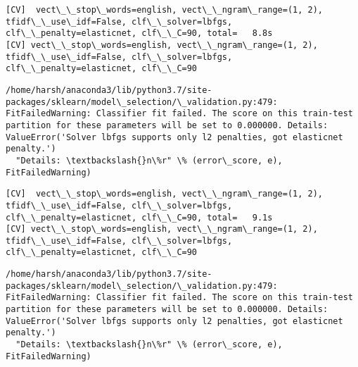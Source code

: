 \documentclass[11pt]{article}
\begin{document}
    \begin{Verbatim}[commandchars=\\\{\}]
[CV]  vect\_\_stop\_words=english, vect\_\_ngram\_range=(1, 2), tfidf\_\_use\_idf=False, clf\_\_solver=lbfgs, clf\_\_penalty=elasticnet, clf\_\_C=90, total=   8.8s
[CV] vect\_\_stop\_words=english, vect\_\_ngram\_range=(1, 2), tfidf\_\_use\_idf=False, clf\_\_solver=lbfgs, clf\_\_penalty=elasticnet, clf\_\_C=90 

    \end{Verbatim}

    \begin{Verbatim}[commandchars=\\\{\}]
/home/harsh/anaconda3/lib/python3.7/site-packages/sklearn/model\_selection/\_validation.py:479: FitFailedWarning: Classifier fit failed. The score on this train-test partition for these parameters will be set to 0.000000. Details: 
ValueError('Solver lbfgs supports only l2 penalties, got elasticnet penalty.')
  "Details: \textbackslash{}n\%r" \% (error\_score, e), FitFailedWarning)

    \end{Verbatim}

    \begin{Verbatim}[commandchars=\\\{\}]
[CV]  vect\_\_stop\_words=english, vect\_\_ngram\_range=(1, 2), tfidf\_\_use\_idf=False, clf\_\_solver=lbfgs, clf\_\_penalty=elasticnet, clf\_\_C=90, total=   9.1s
[CV] vect\_\_stop\_words=english, vect\_\_ngram\_range=(1, 2), tfidf\_\_use\_idf=False, clf\_\_solver=lbfgs, clf\_\_penalty=elasticnet, clf\_\_C=90 

    \end{Verbatim}

    \begin{Verbatim}[commandchars=\\\{\}]
/home/harsh/anaconda3/lib/python3.7/site-packages/sklearn/model\_selection/\_validation.py:479: FitFailedWarning: Classifier fit failed. The score on this train-test partition for these parameters will be set to 0.000000. Details: 
ValueError('Solver lbfgs supports only l2 penalties, got elasticnet penalty.')
  "Details: \textbackslash{}n\%r" \% (error\_score, e), FitFailedWarning)

    \end{Verbatim}
\end{document}
